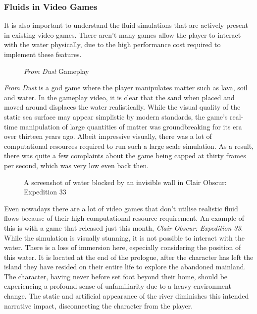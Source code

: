 \documentclass[12pt]{article}
\newcommand{\wideimage}[2][]{%
  \makebox[\textwidth][c]{\texttt{[image: \#2]}}%
}
\begin{document}
    \subsubsection{Fluids in Video Games}

    It is also important to understand the fluid simulations that are actively present in existing video games. There aren't many games allow the player to interact with the water physically, due to the high performance cost required to implement these features.

    \begin{figure}[H]
        \noindent\wideimage[]{fromDust.png}
        \caption{\textit{From Dust} Gameplay \cite{fromdustvideo}}
    \end{figure}

    \textit{From Dust}\cite{fromdust} is a god game where the player manipulates matter such as lava, soil and water. In the gameplay video\cite{fromdustvideo}, it is clear that the sand when placed and moved around displaces the water realistically. While the visual quality of the static sea surface may appear simplistic by modern standards, the game's real-time manipulation of large quantities of matter was groundbreaking for its era over thirteen years ago. Albeit impressive visually, there was a lot of computational resources required to run such a large scale simulation. As a result, there was quite a few complaints about the game being capped at thirty frames per second\cite{dsog}, which was very low even back then.
    
    \begin{figure}[H]
        \noindent\wideimage[]{clairObscur.png}
        \caption{A screenshot of water blocked by an invisible wall in Clair Obscur: Expedition 33}
    \end{figure}

    Even nowadays there are a lot of video games that don't utilise realistic fluid flows because of their high computational resource requirement. An example of this is with a game that released just this month, \textit{Clair Obscur: Expedition 33}\cite{clairobscur}.
    While the simulation is visually stunning, it is not possible to interact with the water. There is a loss of immersion here, especially considering the position of this water. It is located at the end of the prologue, after the character has left the island they have resided on their entire life to explore the abandoned mainland. The character, having never before set foot beyond their home, should be experiencing a profound sense of unfamiliarity due to a heavy environment change. The static and artificial appearance of the river diminishes this intended narrative impact, disconnecting the character from the player.
\end{document}
